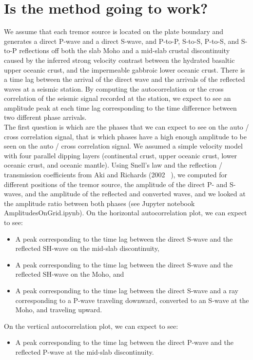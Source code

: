 \documentclass[workdone.tex]{subfiles}
\begin{document}
\section{Is the method going to work?}

We assume that each tremor source is located on the plate boundary and generates a direct P-wave and a direct S-wave, and P-to-P, S-to-S, P-to-S, and S-to-P reflections off both the slab Moho and a mid-slab crustal discontinuity caused by the inferred strong velocity contrast between the hydrated basaltic upper oceanic crust, and the impermeable gabbroic lower oceanic crust. There is a time lag between the arrival of the direct wave and the arrivals of the reflected waves at a seismic station. By computing the autocorrelation or the cross correlation of the seismic signal recorded at the station, we expect to see an amplitude peak at each time lag corresponding to the time difference between two different phase arrivals. \\

The first question is which are the phases that we can expect to see on the auto / cross correlation signal, that is which phases have a high enough amplitude to be seen on the auto / cross correlation signal. We assumed a simple velocity model with four parallel dipping layers (continental crust, upper oceanic crust, lower oceanic crust, and oceanic mantle). Using Snell's law and the reflection / transmission coefficients from Aki and Richards (2002 ~\cite{AKI_2002}), we computed for different positions of the tremor source, the amplitude of the direct P- and S-waves, and the amplitude of the reflected and converted waves, and we looked at the amplitude ratio between both phases (see Jupyter notebook AmplitudesOnGrid.ipynb). On the horizontal autocorrelation plot, we can expect to see:

\begin{itemize}
\item A peak corresponding to the time lag between the direct S-wave and the reflected SH-wave on the mid-slab discontinuity,
\item A peak corresponding to the time lag between the direct S-wave and the reflected SH-wave on the Moho, and
\item A peak corresponding to the time lag between the direct S-wave and a ray corresponding to a P-wave traveling downward, converted to an S-wave at the Moho, and traveling upward.
\end{itemize}

On the vertical autocorrelation plot, we can expect to see:
\begin{itemize}
\item A peak corresponding to the time lag between the direct P-wave and the reflected P-wave at the mid-slab discontinuity.
\end{itemize}
\end{document}
